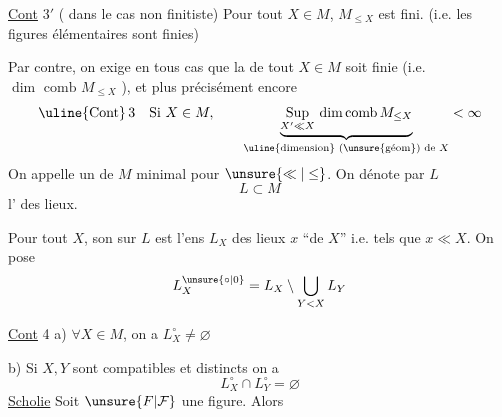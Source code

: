 \uline{Cont} $3'$ ( dans le cas non finitiste) \deleted{$\forall$} Pour tout $X\in M$,   $M_{\leq X}$ est fini. (i.e. les figures élémentaires sont finies)

Par contre, on exige en tous cas que la  de tout  $X\in M$ soit finie (i.e. $\dim\text{ comb }M_{\leq X}$ ), et plus  précisément encore
\[
\uline{\text{Cont}}\,3 \quad \text{Si } X\in M,\qquad
\underbrace{\mathop{\mathrm{Sup}}\limits_{X'\ll X}\,\mathrm{dim\,comb}\,M_{\leq X}}_{\text{\uline{dimension} (\unsure{géom}) de }X}<\infty
\]
On appelle  un  de $M$ minimal pour $\unsure{\ll|\leq}$. On dénote par $L$
\[
L\subset M
\]
l' des lieux.

Pour tout $X$, son   sur $L$ est l'ens $L_{X}$ des lieux $x$  ``de $X$'' i.e. tels que $x\ll X$. On pose
\[
L_X^{\unsure{\circ|0}}=L_X\setminus\bigcup_{Y<X}L_Y
\]

\uline{Cont} 4 \quad a) $\forall X\in M$, on a $L_X^{\circ}\neq\varnothing$

b) Si $X,Y$ sont compatibles et distincts on a
\[
L_X^{\circ}\cap L_Y^{\circ}=\varnothing
\]
\uline{Scholie}  Soit $\unsure{F|\mathcal F}$ une figure. Alors

